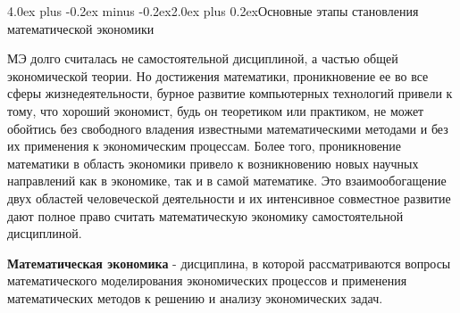 \documentclass[12pt, 4paper]{book}
\makeatletter
\renewcommand{\section}{\@startsection{section}{1}{1pt}%
	{4.0ex plus -0.2ex minus -0.2ex}{2.0ex plus 0.2ex}{\centering\bf}}%
\makeatother
\begin{document}
{	\section{Основные этапы становления математической экономики}
 
МЭ долго считалась не самостоятельной дисциплиной, а частью общей экономической теории. Но достижения математики, проникновение ее во все сферы жизнедеятельности, бурное развитие компьютерных технологий привели к тому, что хороший экономист, будь он теоретиком или практиком, не может обойтись без свободного владения известными математическими методами и без их применения к экономическим процессам. Более того, проникновение математики в область экономики привело к возникновению новых научных направлений как в экономике, так и в самой математике. Это взаимообогащение двух областей человеческой деятельности и их интенсивное совместное развитие дают полное право считать математическую экономику самостоятельной дисциплиной.
 
\textbf{Математическая экономика} - дисциплина, в которой рассматриваются вопросы математического моделирования экономических процессов и применения математических методов к решению и анализу экономических задач.
 
}
\end{document}
